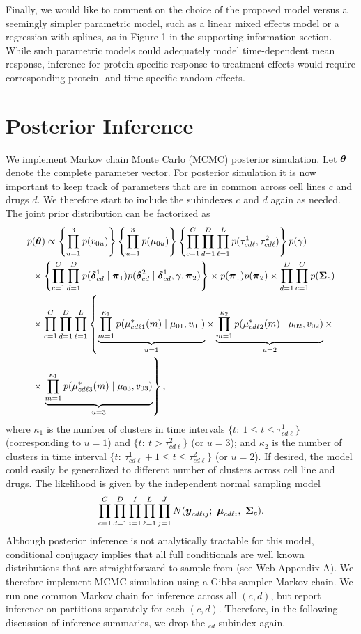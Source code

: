 Finally, we would like to comment on the choice of the proposed model
versus a seemingly simpler parametric model, such as a linear mixed
effects model or a regression with splines, as in Figure 1 in the supporting information section.
While such parametric models could adequately model time-dependent
mean response, inference for protein-specific response to treatment
effects would require corresponding protein- and time-specific random
effects.

\section{Posterior Inference}
\label{sec:inference}

We implement Markov chain Monte Carlo (MCMC) posterior simulation.
Let $\mbox{\boldmath $\theta$}$ denote the complete
parameter vector. For posterior simulation it is now important to keep
track of parameters that are in common across cell lines $c$ and drugs
$d$. We therefore start to include the subindexes $c$ and $d$ again as needed.
The joint prior distribution can be factorized as
\begin{align*}
p&(\bftheta) \propto
 \left\{\prod^3_{u=1}p(v_{0u})\right\}
 \left\{\prod^3_{u=1}p(\mu_{0u})\right\}
 \left\{\prod^C_{c=1}\prod^{D}_{d=1}\prod^L_{\ell=1} p(\tau^1_{cd\ell}, \tau^2_{cd\ell})\right\}
 p(\gamma)\\
%
&\times \left\{\prod^C_{c=1}\prod^D_{d=1}
  p(\bfdelta_{cd}^1\mid \bfpi_1)
  p(\bfdelta^2_{cd} \mid \bfdelta^1_{cd}, \gamma, \bfpi_2)\right\} \times
  p(\bfpi_1) p(\bfpi_2) \times
 \prod^{D}_{d=1} \prod^{C}_{c=1}p(\bfSigma_c)\\
%
& \times  \prod^C_{c=1} \prod^D_{d=1} \prod^L_{\ell=1}
  \left\{
  \underbrace{
  \prod^{\kappa_{1}}_{m=1}p(\mu^*_{cd\ell 1}(m) \mid \mu_{01}, v_{01})
  }_{u=1}\times
  \underbrace{
    \prod^{\kappa_{2}}_{m=1}p(\mu^*_{cd\ell 2}(m) \mid \mu_{02}, v_{02})
  }_{u=2} \times\right.\\
%
&\times \left.
  \underbrace{
    \prod^{\kappa_{1}}_{m=1}p(\mu^*_{cd\ell 3}(m) \mid \mu_{03}, v_{03})
  }_{u=3}
\right\},
\end{align*}
where $\kappa_{1}$ is the number of
clusters in time intervals $\{t: \ 1\leq t \leq \tau^1_{cd\ell}\}$ (corresponding
to $u=1$) and $\{t: \ t > \tau^2_{cd\ell}\}$ (or $u=3$); and $\kappa_2$ is the number of clusters in time interval $\{t: \ \tau^1_{cd\ell}+1\leq t \leq \tau^2_{cd\ell}\}$ (or $u=2$). 
If desired, the model could easily be generalized to different number of clusters
across cell line and drugs. The likelihood is given by the independent normal sampling model
$$
 \prod^{C}_{c=1} \prod^{D}_{d=1} \prod^{I}_{i=1} \prod^{L}_{\ell=1}
 \prod^{J}_{j=1} N( \mbox{\boldmath $y$}_{cd\ell ij}; \ \mbox{\boldmath $\mu$}_{cd \ell i}, \  \mbox{\boldmath $\Sigma$}_c).
$$
Although posterior inference is not analytically tractable for this model,
conditional conjugacy implies that all full conditionals are well known
distributions that are straightforward to sample from (see Web Appendix
A). We therefore implement MCMC simulation using a Gibbs
sampler Markov chain.
We run one common Markov chain for inference across all $(c,d)$,
but report inference on partitions separately for each $(c,d)$. Therefore, in the
following discussion of inference summaries, we drop the
$_{cd}$ subindex again. 

